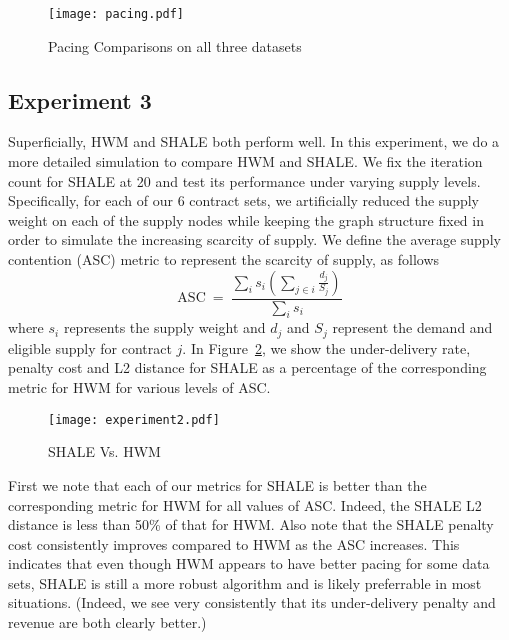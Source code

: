 \begin{figure}[h!]
\centering
\texttt{[image: pacing.pdf]}
\caption{Pacing Comparisons on all three datasets}
\label{fig:pacing}
\end{figure}


\subsection{Experiment 3}
\label{subsec:expt 2}
Superficially, HWM and SHALE both perform well.  In this experiment, we do a  more detailed
simulation to compare HWM and SHALE.
We fix the iteration count for SHALE at 20 and test
its performance under varying supply levels. Specifically, for each of our 6 contract sets, we
artificially reduced the supply weight on each of the supply nodes
while keeping the graph structure fixed in order to simulate the
increasing scarcity of supply. We define the average supply contention (ASC)
metric to represent the scarcity of supply, as follows
\begin{equation}
\label{eqn:avg supply cont}
\textrm{ASC} \ = \ \frac{\sum_i s_i \left(\sum_{j\in
      i}\frac{d_j}{S_j}\right)}{\sum_i s_i}
\end{equation}
where $s_i$ represents the supply weight and $d_j$ and $S_j$ represent
the demand and eligible supply for contract $j$.
In Figure~\ref{fig:expt 2}, we show the
under-delivery rate, penalty cost and L2 distance for SHALE as a
percentage of the corresponding metric for HWM for various levels of
ASC.
\begin{figure}[h!]
\centering
\texttt{[image: experiment2.pdf]}
\caption{SHALE Vs. HWM}
\label{fig:expt 2}
\end{figure}
First we note that each of our metrics for SHALE is better than the
corresponding metric for HWM for all values of ASC. Indeed, the SHALE
L2 distance is less than 50\% of that for HWM. Also note 
that the SHALE penalty cost consistently improves compared to HWM as
the ASC increases.  This indicates that even though HWM appears to have better
pacing for some data sets, SHALE is still a more robust algorithm and is likely
preferrable in most situations.  (Indeed, we see very consistently that its
under-delivery penalty and revenue are both clearly better.)


